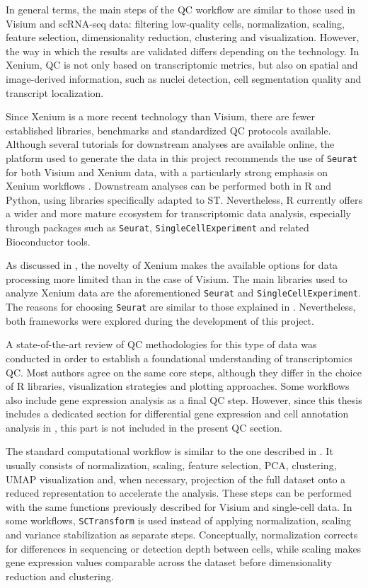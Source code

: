 In general terms, the main steps of the QC workflow are similar to those used in Visium and scRNA-seq data: filtering low-quality cells, normalization, scaling, feature selection, dimensionality reduction, clustering and visualization. However, the way in which the results are validated differs depending on the technology. In Xenium, QC is not only based on transcriptomic metrics, but also on spatial and image-derived information, such as nuclei detection, cell segmentation quality and transcript localization.

Since Xenium is a more recent technology than Visium, there are fewer established libraries, benchmarks and standardized QC protocols available. Although several tutorials for downstream analyses are available online, the platform used to generate the data in this project recommends the use of \texttt{Seurat} for both Visium and Xenium data, with a particularly strong emphasis on Xenium workflows \cite{R4Xenium}. Downstream analyses can be performed both in R and Python, using libraries specifically adapted to ST. Nevertheless, R currently offers a wider and more mature ecosystem for transcriptomic data analysis, especially through packages such as \texttt{Seurat}, \texttt{SingleCellExperiment} and related Bioconductor tools.

As discussed in , the novelty of Xenium makes the available options for data processing more limited than in the case of Visium. The main libraries used to analyze Xenium data are the aforementioned \texttt{Seurat} and \texttt{SingleCellExperiment}. The reasons for choosing \texttt{Seurat} are similar to those explained in . Nevertheless, both frameworks were explored during the development of this project.

A state-of-the-art review of QC methodologies for this type of data was conducted in order to establish a foundational understanding of transcriptomics QC. Most authors agree on the same core steps, although they differ in the choice of R libraries, visualization strategies and plotting approaches. Some workflows also include gene expression analysis as a final QC step. However, since this thesis includes a dedicated section for differential gene expression and cell annotation analysis in , this part is not included in the present QC section.

The standard computational workflow is similar to the one described in . It usually consists of normalization, scaling, feature selection, PCA, clustering, UMAP visualization and, when necessary, projection of the full dataset onto a reduced representation to accelerate the analysis. These steps can be performed with the same functions previously described for Visium and single-cell data. In some workflows, \texttt{SCTransform} is used instead of applying normalization, scaling and variance stabilization as separate steps. Conceptually, normalization corrects for differences in sequencing or detection depth between cells, while scaling makes gene expression values comparable across the dataset before dimensionality reduction and clustering.


